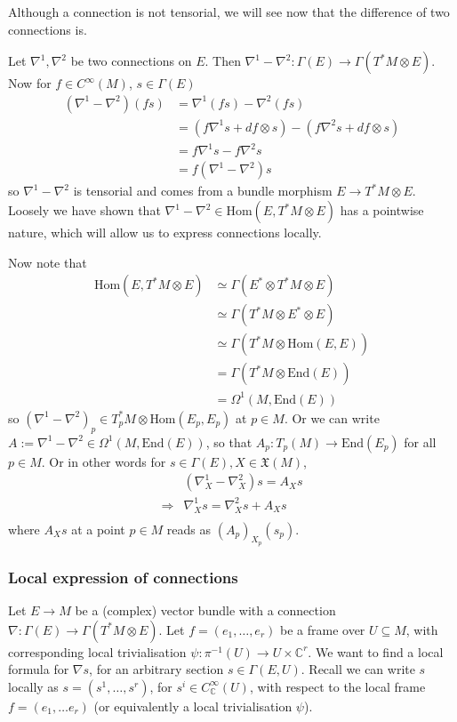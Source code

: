 \documentclass[a4paper]{article}
\theoremstyle{definition} \newtheorem*{definition}{Definition}
\theoremstyle{definition} \newtheorem*{definitions}{Definitions}
\theoremstyle{plain} \newtheorem{theorem}{Theorem}[section]
\theoremstyle{plain} \newtheorem{proposition}[theorem]{Proposition}
\theoremstyle{plain} \newtheorem{corollary}[theorem]{Corollary}
\theoremstyle{plain} \newtheorem{lemma}[theorem]{Lemma}
\theoremstyle{plain} \newtheorem{example}[theorem]{Example}
\newcommand{\complexnos}{\mathbb{C}}
\newcommand{\smoothCmaps}{C^\infty_\complexnos (U)}
\newcommand{\Hom}{\text{Hom}}
\newcommand{\smooth}{C^\infty}
\begin{document}
Although a connection is not tensorial, we will see now that the difference of two connections is.

Let $\nabla^1, \nabla^2$ be two connections on $E$. Then $\nabla^1-\nabla^2:\Gamma(E)\to \Gamma(T^*M\otimes E)$. Now for $f\in \smooth(M)$, $s\in \Gamma(E)$
\begin{align*}
(\nabla^1 - \nabla^2)(fs)
& = \nabla^1(fs) - \nabla^2(fs) \\
& = (f\nabla^1 s + df \otimes s)
- (f\nabla^2 s + df \otimes s) \\
& = f\nabla^1 s - f\nabla^2 s \\
& = f(\nabla^1 - \nabla^2) s
\end{align*}
so $\nabla^1-\nabla^2$ is tensorial and comes from a bundle morphism $E\to T^*M\otimes E$. Loosely we have shown that $\nabla^1-\nabla^2\in \Hom (E, T^*M\otimes E)$ has a pointwise nature, which will allow us to express connections locally.

Now note that 
\begin{align*}
\Hom (E, T^*M\otimes E) & \simeq \Gamma(E^* \otimes T^*M\otimes E) \\
& \simeq \Gamma(T^*M\otimes E^* \otimes E) \\
& \simeq \Gamma(T^*M \otimes \Hom(E, E)) \\
& = \Gamma(T^*M \otimes \text{End}(E)) \\
& = \Omega^1(M, \text{End}(E))
\end{align*}
so $(\nabla^1-\nabla^2)_p\in T^*_pM\otimes \Hom(E_p, E_p)$ at $p\in M$. Or we can write $A:=\nabla^1-\nabla^2 \in \Omega^1(M, \text{End}(E))$, so that 
$A_p:T_p(M)\to \text{End}(E_p)$ for all $p\in M$. Or in other words for $s\in \Gamma(E), X\in \mathfrak{X}(M)$,
\begin{align*}
& (\nabla^1_X - \nabla^2_X)s = A_X s \\
\Rightarrow & \nabla^1_X s = \nabla^2_X s + A_X s \\
\end{align*}
where $A_X s$ at a point $p\in M$ reads as $(A_p)_{X_p} (s_p)$.

\subsubsection{Local expression of connections}
Let $E\to M$ be a (complex) vector bundle with a connection $\nabla:\Gamma(E)\to \Gamma(T^*M\otimes E)$.  Let $f=(e_1, \ldots, e_r)$ be a frame over $U\subseteq M$, with corresponding local trivialisation $\psi:\pi^{-1}(U)\to U\times \complexnos^r$. 
We want to find a local formula for $\nabla s$,  for an arbitrary section $s\in \Gamma(E, U)$.
Recall we can write $s$ locally as $s=(s^1, \ldots,  s^r)$,  for $s^i\in \smoothCmaps$,  with respect to the local frame $f=(e_1, \ldots e_r)$ (or equivalently a local trivialisation $\psi$).
\end{document}
